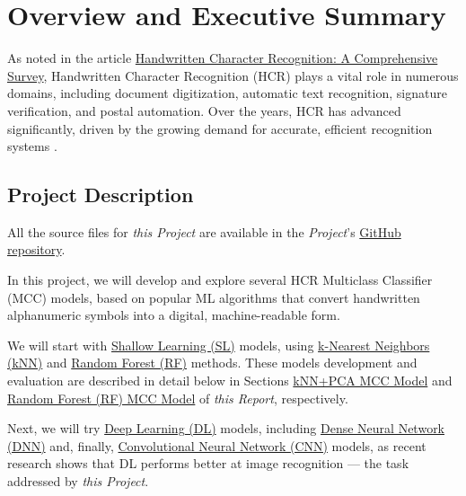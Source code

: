 \documentclass[
]{report}
\begin{document}
\chapter{Overview and Executive Summary}\label{intro}

As noted in the article \href{https://ieeexplore.ieee.org/document/10420981}{Handwritten Character Recognition: A Comprehensive Survey}, Handwritten Character Recognition (HCR) plays a vital role in numerous domains, including document digitization, automatic text recognition, signature verification, and postal automation. Over the years, HCR has advanced significantly, driven by the growing demand for accurate, efficient recognition systems \autocite{AAASM_SICI10420981}.

\section{Project Description}\label{project-description}

\begin{noteblock}
All the source files for \emph{this Project} are available in the \emph{Project}'s \href{https://github.com/AzKurban-edX-DS/edx.capstone.choose-your-own}{GitHub repository}\autocite{edx.Capstone_CYO}.

\end{noteblock}

In this project, we will develop and explore several HCR Multiclass Classifier (MCC) models, based on popular ML algorithms that convert handwritten alphanumeric symbols into a digital, machine-readable form.

We will start with \href{https://soulpageit.com/ai-glossary/shallow-learning-explained/}{Shallow Learning (SL)} models, using \href{https://rafalab.dfci.harvard.edu/dsbook-part-2/ml/resampling-methods.html\#sec-knn-cv-intro}{k-Nearest Neighbors (kNN)} and \href{https://rafalab.dfci.harvard.edu/dsbook-part-2/ml/algorithms.html\#sec-random-forests}{Random Forest (RF)} methods. These models development and evaluation are described in detail below in Sections \hyperref[knn_pca_model]{kNN+PCA MCC Model} and \hyperref[rf_model]{Random Forest (RF) MCC Model} of \emph{this Report}, respectively.

Next, we will try \href{https://soulpageit.com/ai-glossary/deep-learning-explained/}{Deep Learning (DL)} models, including \href{https://smltar.com/dldnn}{Dense Neural Network (DNN)} and, finally, \href{https://smltar.com/dlcnn\#what-are-cnns}{Convolutional Neural Network (CNN)} models, as recent research shows that DL performs better at image recognition --- the task addressed by \emph{this Project}.
\end{document}
